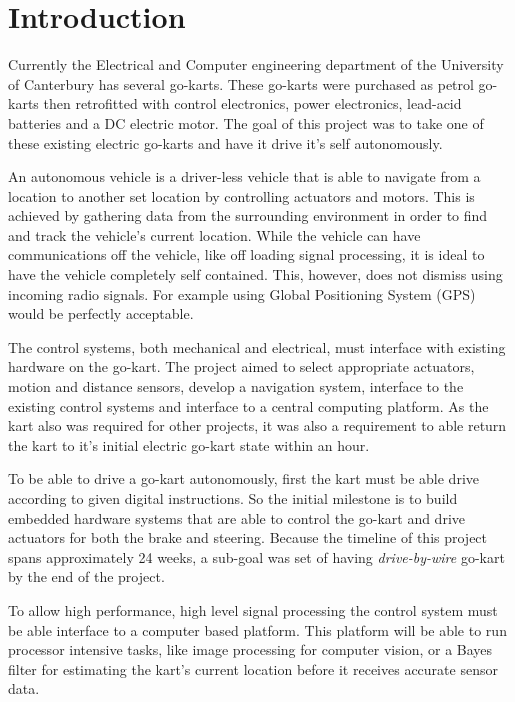\section{Introduction}
  Currently the Electrical and Computer engineering department of the
  University of Canterbury has several go-karts. These go-karts were purchased
  as petrol go-karts then retrofitted with control electronics, power
  electronics, lead-acid batteries and a DC electric motor. The goal of this
  project was to take one of these existing electric go-karts and have it drive
  it's self autonomously. 

  An autonomous vehicle is a driver-less vehicle that is able to navigate from
  a location to another set location by controlling actuators and motors. This
  is achieved by gathering data from the surrounding environment in order to
  find and track the vehicle's current location. While the vehicle can have
  communications off the vehicle, like off loading signal processing, it is
  ideal to have the vehicle completely self contained. This, however, does not
  dismiss using incoming radio signals. For example using Global Positioning
  System (GPS) would be perfectly acceptable.

  The control systems, both mechanical and electrical, must interface with
  existing hardware on the go-kart. The project aimed to select appropriate
  actuators, motion and distance sensors, develop a navigation system,
  interface to the existing control systems and interface to a central
  computing platform.  As the kart also was required for other projects, it was
  also a requirement to able return the kart to it's initial electric go-kart
  state within an hour.

  To be able to drive a go-kart autonomously, first the kart must be able drive
  according to given digital instructions. So the initial milestone is to build
  embedded hardware systems that are able to control the go-kart and drive
  actuators for both the brake and steering. Because the timeline of this
  project spans approximately 24 weeks, a sub-goal was set of having
  \emph{drive-by-wire} go-kart by the end of the project.

  To allow high performance, high level signal processing the control system
  must be able interface to a computer based platform. This platform will be
  able to run processor intensive tasks, like image processing for computer
  vision\cite{openCV}, or a Bayes filter for estimating the kart's current
  location before it receives accurate sensor data.

